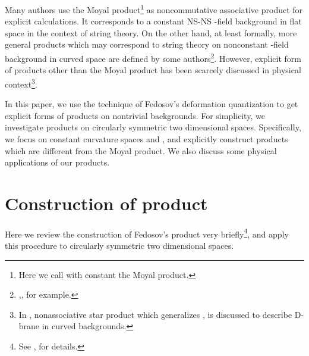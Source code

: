 \documentclass[12pt,a4paper]{article}
\begin{document}
Many authors use the Moyal product\footnote{Here we call
        \coordHE{} with constant \coordHE{} the
        Moyal product.}
as noncommutative associative  \myHighlight{$*$}\coordHE{} product for explicit calculations. 
It corresponds to a constant NS-NS \coordHE{}-field background in flat space in
        the context of string theory. 
On the other hand, at least formally, more general \myHighlight{$*$}\coordHE{} products
which may correspond to string theory on nonconstant \coordHE{}-field
        background in curved space 
are defined by some authors\footnote{\cite{KON},\cite{Fedbk}, for
        example.}.
However, explicit form of \myHighlight{$*$}\coordHE{} products other than the Moyal product has
        been scarcely discussed in physical context\footnote{
In \cite{CS}, nonassociative star product which generalizes
        \cite{KON},\cite{Fedbk} is discussed to describe D-brane in
        curved backgrounds.}.



In this paper, we use the technique of Fedosov's deformation
quantization \cite{Fedbk} to get explicit forms of \myHighlight{$*$}\coordHE{} products on
nontrivial backgrounds. 
For simplicity, we investigate \myHighlight{$*$}\coordHE{} products on circularly symmetric two
dimensional spaces. Specifically, we focus on constant curvature
spaces \coordHE{} and \coordHE{}, and explicitly construct \myHighlight{$*$}\coordHE{}
products which are different from the Moyal product.
We also discuss some physical applications of our \myHighlight{$*$}\coordHE{} products.

\section{Construction of \myHighlight{$*$}\coordHE{} product\label{sec:CIR}}

Here we review the construction of Fedosov's \myHighlight{$*$}\coordHE{} product very briefly\footnote{
See \cite{Fedbk},\cite{AK2} for details.
}, and apply this procedure to circularly symmetric two dimensional spaces.
\end{document}
